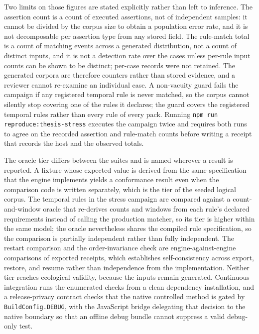 Two limits on those figures are stated explicitly rather than left to inference. The assertion count is a count of executed assertions, not of independent samples: it cannot be divided by the corpus size to obtain a population error rate, and it is not decomposable per assertion type from any stored field. The rule-match total is a count of matching events across a generated distribution, not a count of distinct inputs, and it is not a detection rate over the \StressCorpusN{} cases unless per-rule input counts can be shown to be distinct; per-case records were not retained. The generated corpora are therefore counters rather than stored evidence, and a reviewer cannot re-examine an individual case. A non-vacuity guard fails the campaign if any registered temporal rule is never matched, so the corpus cannot silently stop covering one of the rules it declares; the guard covers the registered temporal rules rather than every rule of every pack. Running \texttt{npm run reproduce:thesis-stress} executes the campaign twice and requires both runs to agree on the recorded assertion and rule-match counts before writing a receipt that records the host and the observed totals.

The oracle tier differs between the suites and is named wherever a result is reported. A fixture whose expected value is derived from the same specification that the engine implements yields a conformance result even when the comparison code is written separately, which is the tier of the seeded logical corpus. The temporal rules in the stress campaign are compared against a count-and-window oracle that re-derives counts and windows from each rule's declared requirements instead of calling the production matcher, so its tier is higher within the same model; the oracle nevertheless shares the compiled rule specification, so the comparison is partially independent rather than fully independent. The restart comparison and the order-invariance check are engine-against-engine comparisons of exported receipts, which establishes self-consistency across export, restore, and resume rather than independence from the implementation. Neither tier reaches ecological validity, because the inputs remain generated. Continuous integration runs the enumerated checks from a clean dependency installation, and a release-privacy contract checks that the native controlled method is gated by \texttt{BuildConfig.DEBUG}, with the JavaScript bridge delegating that decision to the native boundary so that an offline debug bundle cannot suppress a valid debug-only test.

